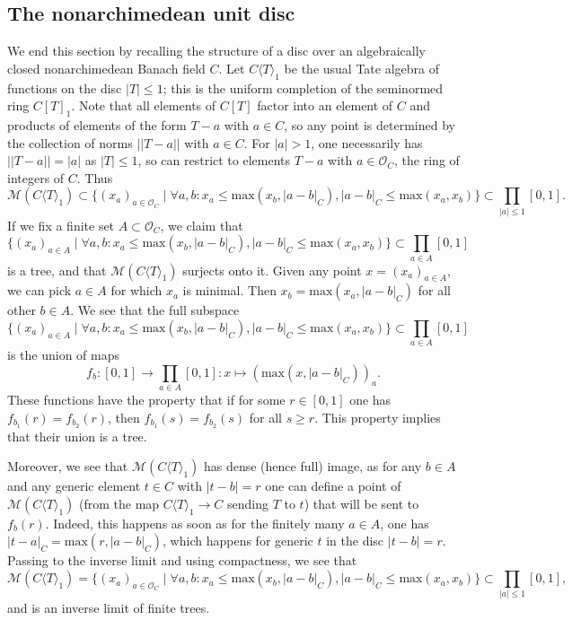 \documentclass[11pt]{amsart}
\numberwithin{equation}{section}
\numberwithin{theorem}{section}
\theoremstyle{definition}
\begin{document}
\subsection{The nonarchimedean unit disc} We end this section by recalling the structure of a disc over an algebraically closed nonarchimedean Banach field $C$. Let $C\langle T\rangle_1$ be the usual Tate algebra of functions on the disc $|T|\leq 1$; this is the uniform completion of the seminormed ring $C[T]_1$. Note that all elements of $C[T]$ factor into an element of $C$ and products of elements of the form $T-a$ with $a\in C$, so any point is determined by the collection of norms $||T-a||$ with $a\in C$. For $|a|>1$, one necessarily has $||T-a||=|a|$ as $|T|\leq 1$, so can restrict to elements $T-a$ with $a\in \mathcal O_C$, the ring of integers of $C$. Thus
\[
\mathcal M(C\langle T\rangle_1)\subset \Big\{(x_a)_{a\in \mathcal O_C}\mid \forall a,b: x_a\leq \mathrm{max}(x_b,|a-b|_C), |a-b|_C\leq \mathrm{max}(x_a,x_b)\Big\}\subset \prod_{|a|\leq 1} [0,1].
\]
If we fix a finite set $A\subset \mathcal O_C$, we claim that
\[
\{(x_a)_{a\in A}\mid \forall a,b: x_a\leq \mathrm{max}(x_b,|a-b|_C), |a-b|_C\leq \mathrm{max}(x_a,x_b)\}\subset \prod_{a\in A} [0,1]
\]
is a tree, and that $\mathcal M(C\langle T\rangle_1)$ surjects onto it. Given any point $x=(x_a)_{a\in A}$, we can pick $a\in A$ for which $x_a$ is minimal. Then $x_b = \mathrm{max}(x_a,|a-b|_C)$ for all other $b\in A$. We see that the full subspace
\[
\Big\{(x_a)_{a\in A}\mid \forall a,b: x_a\leq \mathrm{max}(x_b,|a-b|_C), |a-b|_C\leq \mathrm{max}(x_a,x_b)\Big\}\subset \prod_{a\in A} [0,1]
\]
is the union of maps
\[
f_b: [0,1]\to \prod_{a\in A} [0,1]: x\mapsto (\mathrm{max}(x,|a-b|_C))_a.
\]
These functions have the property that if for some $r\in [0,1]$ one has $f_{b_1}(r)=f_{b_2}(r)$, then $f_{b_1}(s)=f_{b_2}(s)$ for all $s\geq r$. This property implies that their union is a tree.

Moreover, we see that $\mathcal M(C\langle T\rangle_1)$ has dense (hence full) image, as for any $b\in A$ and any generic element $t\in C$ with $|t-b|=r$ one can define a point of $\mathcal M(C\langle T\rangle_1)$ (from the map $C\langle T\rangle_1\to C$ sending $T$ to $t$) that will be sent to $f_b(r)$. Indeed, this happens as soon as for the finitely many $a\in A$, one has $|t-a|_C=\mathrm{max}(r,|a-b|_C)$, which happens for generic $t$ in the disc $|t-b|=r$. Passing to the inverse limit and using compactness, we see that
\[
\mathcal M(C\langle T\rangle_1)= \Big\{(x_a)_{a\in \mathcal O_C}\mid \forall a,b: x_a\leq \mathrm{max}(x_b,|a-b|_C), |a-b|_C\leq \mathrm{max}(x_a,x_b)\Big\}\subset \prod_{|a|\leq 1} [0,1],
\]
and is an inverse limit of finite trees.
\end{document}
